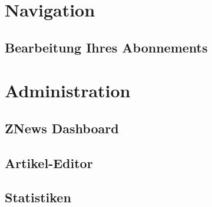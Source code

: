 

\newcommand*{\thetitle}{ZNews\\ Bedienungsanleitung}

\Begin

\section{Navigation}


\subsection{Bearbeitung Ihres Abonnements}


\section{Administration}

\subsection{ZNews Dashboard}


\subsection{Artikel-Editor}


\subsection{Statistiken}


\End
